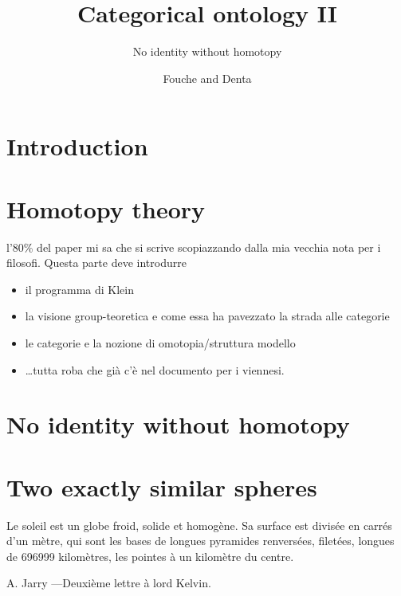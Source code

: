 \documentclass{amsart}
\author{Fouche and Denta}
\title{Categorical ontology II}
\subtitle{No identity without homotopy}
\begin{document}
\section{Introduction}
\section{Homotopy theory}
l'80\% del paper mi sa che si scrive scopiazzando dalla mia vecchia nota per i filosofi. Questa parte deve introdurre
\begin{itemize}
  \item il programma di Klein 
  \item la visione group-teoretica e come essa ha pavezzato la strada alle categorie
  \item le categorie e la nozione di omotopia/struttura modello
  \item \dots tutta roba che già c'è nel documento per i viennesi.
\end{itemize}
\section{No identity without homotopy}
\section{Two exactly similar spheres}
\epigraph{Le soleil est un globe froid, solide et homogène. Sa surface est divisée en carrés d’un mètre, qui sont les bases de longues pyramides renversées, filetées, longues de 696999 kilomètres, les pointes à un kilomètre du centre. }{A. Jarry ---Deuxième lettre à lord Kelvin.}
\end{document}

